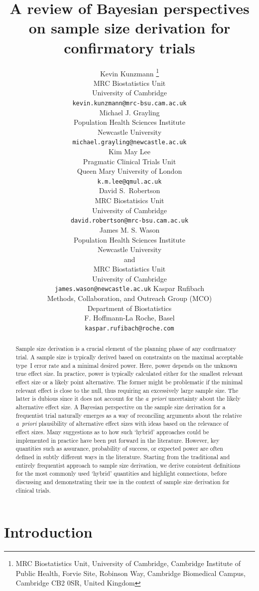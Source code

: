 \documentclass{article}
\title{A review of Bayesian perspectives on sample size derivation for confirmatory trials}
\author{
  Kevin Kunzmann \thanks{
        MRC Biostatistics Unit, University of Cambridge,
        Cambridge Institute of Public Health,
        Forvie Site, Robinson Way,
        Cambridge Biomedical Campus,
        Cambridge CB2 0SR,
        United Kingdom
    }\\
    MRC Biostatistics Unit \\
    University of Cambridge \\
    \texttt{kevin.kunzmann@mrc-bsu.cam.ac.uk} \\
    \And
    Michael J. Grayling \\
    Population Health Sciences Institute \\
    Newcastle University \\
    \texttt{michael.grayling@newcastle.ac.uk} \\
    \And
    Kim May Lee \\
    Pragmatic Clinical Trials Unit\\
    Queen Mary University of London\\
    \texttt{k.m.lee@qmul.ac.uk} \\
    \And
    David S.\ Robertson \\
    MRC Biostatisics Unit\\
    University of Cambridge\\
    \texttt{david.robertson@mrc-bsu.cam.ac.uk} \\
     \And
    James M. S. Wason \\
    Population Health Sciences Institute \\
    Newcastle University\\
    and \\
     MRC Biostatistics Unit \\
    University of Cambridge \\
    \texttt{james.wason@newcastle.ac.uk}
    \And
    Kaspar Rufibach \\
    Methods, Collaboration, and Outreach Group (MCO) \\
    Department of Biostatistics\\
    F. Hoffmann-La Roche, Basel\\
    \texttt{kaspar.rufibach@roche.com}
}
\begin{document}
\maketitle

\captionsetup{width=\textwidth}

\begin{abstract}
Sample size derivation is a crucial element of the planning phase of any confirmatory trial.
A sample size is typically derived based on
constraints on the maximal acceptable type~I error rate and a
minimal desired power.
Here, power depends on the unknown true effect size.
In practice, power is typically calculated either for the smallest relevant effect size or a likely point alternative.
The former might be problematic if the minimal relevant effect is close to the null, thus requiring an excessively large sample size.
The latter is dubious since it does not account for the \textit{a~priori} uncertainty about the likely alternative effect size.
A Bayesian perspective on the sample size derivation for a frequentist
trial naturally emerges as a way of reconciling arguments about the relative \textit{a~priori} plausibility of alternative effect sizes with ideas based on the relevance of effect sizes.
Many suggestions as to how such `hybrid' approaches could be implemented in practice have been put forward in the literature.
However, key quantities such as assurance, probability of success, or expected power are often defined in subtly different ways in the literature.
Starting from the traditional and entirely frequentist approach to sample size derivation, we derive consistent definitions for the most commonly used
`hybrid' quantities and highlight connections, before discussing and demonstrating their use in the context of sample size derivation for clinical trials.
\end{abstract}



\section{Introduction}
\label{sec:intro}
\end{document}
